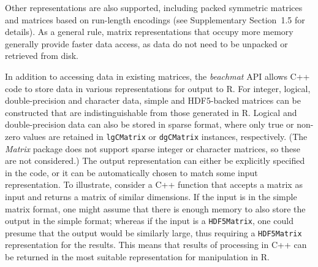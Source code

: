 \documentclass[10pt,letterpaper]{article}
\newcommand{\suppsecother}{1.5}
\newcommand{\suppseclayoutoptim}{2}
\newcommand{\beachmat}{\textit{beachmat}}
\newcommand{\code}[1]{\texttt{#1}}
\begin{document}
Other representations are also supported, including packed symmetric matrices and matrices based on run-length encodings (see Supplementary Section~\suppsecother{} for details).
As a general rule, matrix representations that occupy more memory generally provide faster data access, as data do not need to be unpacked or retrieved from disk.

In addition to accessing data in existing matrices, the \beachmat{} API allows C++ code to store data in various representations for output to R.
For integer, logical, double-precision and character data, simple and HDF5-backed matrices can be constructed that are indistinguishable from those generated in R.
Logical and double-precision data can also be stored in sparse format, where only true or non-zero values are retained in \code{lgCMatrix} or \code{dgCMatrix} instances, respectively.
(The \textit{Matrix} package does not support sparse integer or character matrices, so these are not considered.)
The output representation can either be explicitly specified in the code, or it can be automatically chosen to match some input representation.
To illustrate, consider a C++ function that accepts a matrix as input and returns a matrix of similar dimensions.
If the input is in the simple matrix format, one might assume that there is enough memory to also store the output in the simple format;
whereas if the input is a \code{HDF5Matrix}, one could presume that the output would be similarly large, thus requiring a \code{HDF5Matrix} representation for the results.
This means that results of processing in C++ can be returned in the most suitable representation for manipulation in R.
 
\end{document}
